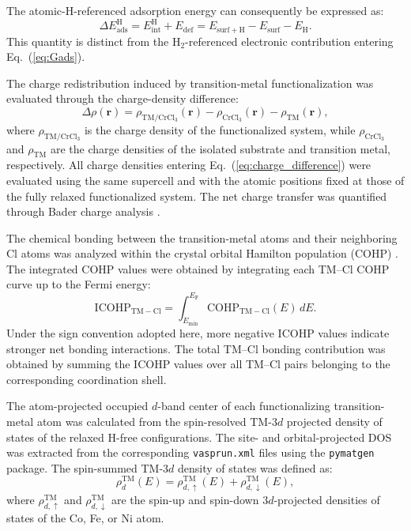 \documentclass[journal=jacsat,manuscript=article]{achemso}
\begin{document}
The atomic-H-referenced adsorption energy can consequently be expressed as:
\begin{equation}
  \Delta E_{\mathrm{ads}}^{\mathrm{H}}
  =
  E_{\mathrm{int}}^{\mathrm{H}}
  +
  E_{\mathrm{def}}
  =
  E_{\mathrm{surf+H}}
  -
  E_{\mathrm{surf}}
  -
  E_{\mathrm{H}}.
  \label{eq:Eads_atomic}
\end{equation}
This quantity is distinct from the H$_2$-referenced electronic contribution entering Eq.~(\ref{eq:Gads}).

The charge redistribution induced by transition-metal functionalization was evaluated through the charge-density difference:
\begin{equation}
  \Delta \rho(\mathbf{r})
  =
  \rho_{\mathrm{TM/CrCl_3}}(\mathbf{r})
  -
  \rho_{\mathrm{CrCl_3}}(\mathbf{r})
  -
  \rho_{\mathrm{TM}}(\mathbf{r}),
  \label{eq:charge_difference}
\end{equation}
where $\rho_{\mathrm{TM/CrCl_3}}$ is the charge density of the functionalized system, while $\rho_{\mathrm{CrCl_3}}$ and $\rho_{\mathrm{TM}}$ are the charge densities of the isolated substrate and transition metal, respectively. All charge densities entering Eq.~(\ref{eq:charge_difference}) were evaluated using the same supercell and with the atomic positions fixed at those of the fully relaxed functionalized system. The net charge transfer was quantified through Bader charge analysis \cite{Henkelman2006,Tang_2009, SANVILLEJCC2007, YUJPCP2011}.

The chemical bonding between the transition-metal atoms and their neighboring Cl atoms was analyzed within the crystal orbital Hamilton population (COHP)  \cite{Dronskowki2002}. The integrated COHP values were obtained by integrating each TM--Cl COHP curve up to the Fermi energy:
\begin{equation}
  \mathrm{ICOHP}_{\mathrm{TM-Cl}}
  =
  \int_{E_{\min}}^{E_{\mathrm{F}}}
  \mathrm{COHP}_{\mathrm{TM-Cl}}(E)\,dE.
  \label{eq:ICOHP}
\end{equation}
Under the sign convention adopted here, more negative ICOHP values indicate stronger net bonding interactions. The total TM--Cl bonding contribution was obtained by summing the ICOHP values over all TM--Cl pairs belonging to the corresponding coordination shell.

The atom-projected occupied $d$-band center of each functionalizing transition-metal atom was calculated from the spin-resolved TM-$3d$ projected density of states of the relaxed H-free configurations. The site- and orbital-projected DOS was extracted from the corresponding \texttt{vasprun.xml} files using the \texttt{pymatgen} package. The spin-summed TM-$3d$ density of states was defined as:
\begin{equation}
  \rho_{d}^{\mathrm{TM}}(E)
  =
  \rho_{d,\uparrow}^{\mathrm{TM}}(E)
  +
  \rho_{d,\downarrow}^{\mathrm{TM}}(E),
  \label{eq:spin_summed_dos}
\end{equation}
where $\rho_{d,\uparrow}^{\mathrm{TM}}$ and
$\rho_{d,\downarrow}^{\mathrm{TM}}$ are the spin-up and
spin-down $3d$-projected densities of states of the Co, Fe,
or Ni atom.
\end{document}
